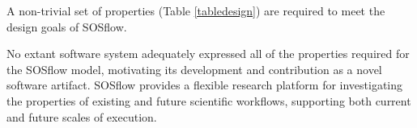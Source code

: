 A non-trivial set of properties (Table \ref{tabledesign}) are required
to meet the design goals of SOSflow.
%

%
No extant software system adequately expressed all of the properties
required for the SOSflow model, motivating its development and
contribution as a novel software artifact.
%
SOSflow provides a flexible research platform for investigating the
properties of existing and future scientific workflows, supporting
both current and future scales of execution.


%
%
%


